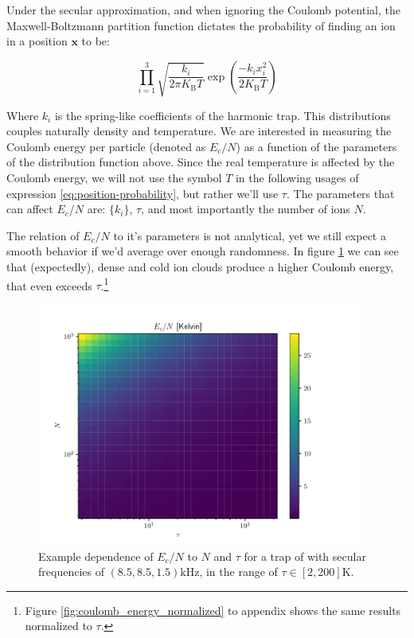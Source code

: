 Under the secular approximation, and when ignoring the Coulomb potential, the Maxwell-Boltzmann partition function dictates the probability of finding an ion in a position $\mathbf{x}$ to be:

\begin{equation}
	\prod_{i=1}^3 \sqrt{\frac{k_i}{2\pi K_\text{B} T}} \exp\left(\frac{-k_i x_i^2}{2 K_\text{B} T}\right)
	\label{eq:position-probability}
\end{equation}

Where $k_i$ is the spring-like coefficients of the harmonic trap. This distributions couples naturally density and temperature. We are interested in measuring the Coulomb energy per particle (denoted as $E_c/N$) as a function of the parameters of the distribution function above. Since the real temperature is affected by the Coulomb energy, we will not use the symbol $T$ in the following usages of expression \ref{eq:position-probability}, but rather we'll use $\tau$. The parameters that can affect $E_c/N$ are: $\{k_i\}$, $\tau$, and most importantly the number of ions $N$.

The relation of $E_c/N$ to it's parameters is not analytical, yet we still expect a smooth behavior if we'd average over enough randomness. In figure \ref{fig:coulomb_energy} we can see that (expectedly), dense and cold ion clouds produce a higher Coulomb energy, that even exceeds $\tau$.\footnote{Figure \ref{fig:coulomb_energy_normalized} to appendix shows the same results normalized to $\tau$.}

\begin{figure}
	\begin{center}
		\includegraphics[width=0.95\textwidth]{graphics/coulomb_energy_example@coulomb_energy.pdf}
	\end{center}
	\caption{Example dependence of $E_c/N$ to $N$ and $\tau$ for a trap of  with secular frequencies of $(8.5, 8.5, 1.5) \mathrm{kHz}$, in the range of $\tau\in[2, 200]\mathrm{K}$.}\label{fig:coulomb_energy}
\end{figure}

